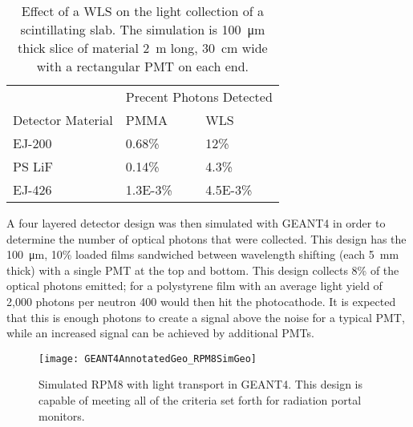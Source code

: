   \begin{table}
  \caption[Light Collection Increase with a WLS Bar]{Effect of a WLS on the light collection of a scintillating slab. The simulation is \SI{100}{\um} thick slice of material \SI{2}{\m} long, \SI{30}{\cm} wide with a rectangular PMT on each end.}
  \label{tab:WLSStudy}
  \begin{tabular}{p{4cm} m{3cm} m{3cm}}
  \toprule
  & \multicolumn{2}{c}{Precent Photons Detected} \\
  Detector Material & PMMA &  WLS \\
  \midrule
 EJ-200 & 0.68\%  & 12\% \\
 PS LiF & 0.14\% & 4.3\% \\
 EJ-426 & \num{1.3E-3}\% & \num{4.5E-3}\% \\
 \bottomrule
  \end{tabular}
\end{table}

A four layered detector design was then simulated with GEANT4 in order to determine the number of optical photons that were collected.
This design has the \SI{100}{\um}, 10\% loaded  films sandwiched between wavelength shifting (each \SI{5}{\mm} thick) with a single PMT at the top and bottom.
This design collects 8\% of the optical photons emitted; for a polystyrene film with an average light yield of 2,000 photons per neutron 400 would then hit the photocathode.
It is expected that this is enough photons to create a signal above the noise for a typical PMT, while an increased signal can be achieved by additional PMTs.
\begin{figure}
  \centering
	\texttt{[image: GEANT4AnnotatedGeo\_RPM8SimGeo]}
	  \caption[GEANT4 Simulated RPM8 Detector Design]{Simulated RPM8 with light transport in GEANT4. This design is capable of meeting all of the criteria set forth for radiation portal monitors.}
  \label{fig:G4RPM8Geo}
\end{figure}


